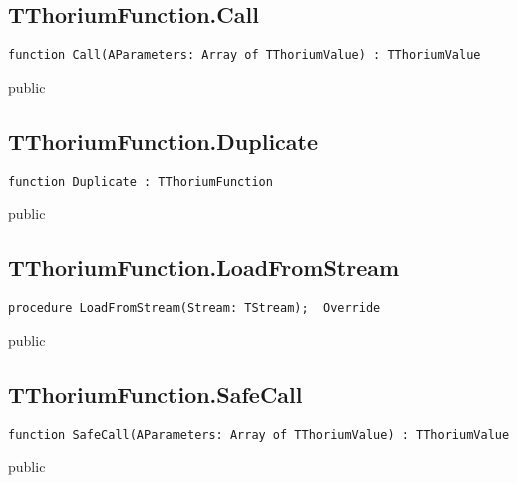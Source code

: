 \subsection{TThoriumFunction.Call}
\label{thoriumcore:thorium:tthoriumfunction:call}
\begin{FPCList}
\Synopsis
\Declaration 

\begin{verbatim}
function Call(AParameters: Array of TThoriumValue) : TThoriumValue
\end{verbatim}
\Visibility
public
\Description
\Errors
\end{FPCList}
\subsection{TThoriumFunction.Duplicate}
\label{thoriumcore:thorium:tthoriumfunction:duplicate}
\begin{FPCList}
\Synopsis
\Declaration 

\begin{verbatim}
function Duplicate : TThoriumFunction
\end{verbatim}
\Visibility
public
\Description
\Errors
\end{FPCList}
\subsection{TThoriumFunction.LoadFromStream}
\label{thoriumcore:thorium:tthoriumfunction:loadfromstream}
\begin{FPCList}
\Synopsis
\Declaration 

\begin{verbatim}
procedure LoadFromStream(Stream: TStream);  Override
\end{verbatim}
\Visibility
public
\Description
\Errors
\end{FPCList}
\subsection{TThoriumFunction.SafeCall}
\label{thoriumcore:thorium:tthoriumfunction:safecall}
\begin{FPCList}
\Synopsis
\Declaration 

\begin{verbatim}
function SafeCall(AParameters: Array of TThoriumValue) : TThoriumValue
\end{verbatim}
\Visibility
public
\Description
\Errors
\end{FPCList}
